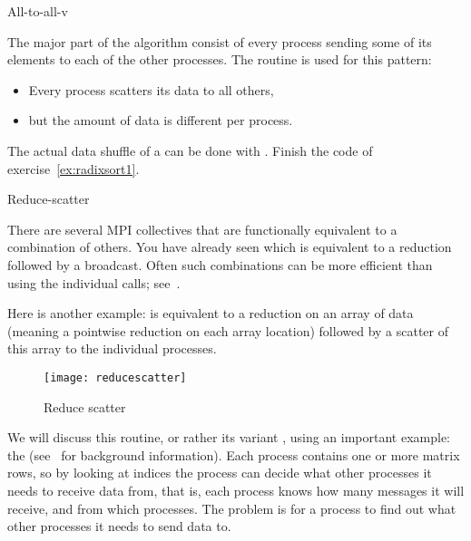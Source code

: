 
 {All-to-all-v}
\label{sec:alltoallv}

The major part of the  algorithm consist
of every process sending some of its elements to
each of the other processes.
The routine  is used for this pattern:
\begin{itemize}
\item Every process scatters its data to all others,
\item but the amount of data is different per process.
\end{itemize}

\begin{exercise}
  \label{ex:radixsort2}
  The actual data shuffle of a  can be done
  with . Finish the code of
  exercise~\ref{ex:radixsort1}.
\end{exercise}

 {Reduce-scatter}
\label{sec:reducescatter}

There are several MPI collectives that are functionally equivalent to
a combination of others. You have already seen  which
is equivalent to a reduction followed by a broadcast. Often such
combinations can be more efficient than using the individual calls;
see~.

Here is another example:  is equivalent
to a reduction on an array of data (meaning a pointwise reduction on each
array location) followed by a scatter of this array to the individual 
processes.

\begin{figure}[ht]
  \texttt{[image: reducescatter]}
  \caption{Reduce scatter}
  \label{fig:reducescatter}
\end{figure}

We will discuss this routine,
or rather its variant ,
using an important example: the
(see~ for background information).
Each process contains one or more matrix rows, so by looking at indices
the process can decide what other processes it needs
to receive data from,
that is, each process knows how many messages it will receive,
and from which processes.
The problem is for a process to find out what other processes 
it needs to send data to.

